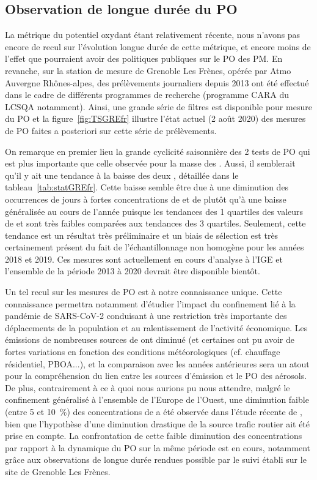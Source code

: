 \clearpage
\subsection{Observation de longue durée du PO}%
\label{sub:observation_longue_duree}

La métrique du potentiel oxydant étant relativement récente, nous n'avons pas encore de
recul sur l'évolution longue durée de cette métrique, et encore moins de l'effet que
pourraient avoir des politiques publiques sur le PO des PM. En revanche, sur la station de
mesure de Grenoble Les Frènes, opérée par Atmo Auvergne Rhônes-alpes, des prélèvements
journaliers depuis 2013 ont été effectué dans le cadre de différents programmes de
recherche (programme CARA du LCSQA notamment). Ainsi, une grande série de filtres est
disponible pour mesure du PO et la figure~\ref{fig:TSGREfr} illustre l'état actuel (2
août 2020) des mesures de PO faites a posteriori sur cette série de prélèvements.

On remarque en premier lieu la grande cyclicité saisonnière des 2 tests de PO 
qui est plus importante que celle observée pour la masse des \PMdix.
Aussi, il semblerait qu'il y ait une tendance à la baisse des deux \POv, détaillée dans le
tableau~\ref{tab:statGREfr}. Cette baisse semble être due à une diminution des occurrences
de jours à fortes concentrations de \PMdix{} et de \POv{} plutôt qu'à une baisse
généralisée au cours de l'année puisque les tendances des 1\iers{} quartiles des valeurs de
\POv{} et \PMdix{} sont très faibles comparées aux tendances des 3\iemes{} quartiles.
Seulement, cette tendance est un résultat très préliminaire et un biais de sélection est
très certainement présent du fait de l'échantillonnage non homogène pour les années 2018
et 2019.
Ces mesures sont actuellement en cours d'analyse à l'IGE et l'ensemble de la période 2013
à 2020 devrait être disponible bientôt.

Un tel recul sur les mesures de PO est à notre connaissance unique. Cette connaissance
permettra notamment d'étudier l'impact du confinement lié à la pandémie de SARS-CoV-2
conduisant à une restriction très importante des déplacements de la population et au
ralentissement de l'activité économique. Les émissions de nombreuses sources de \PMdix{}
ont diminué (et certaines ont pu avoir de fortes variations en fonction des conditions
météorologiques (cf. chauffage résidentiel, PBOA...), et la comparaison avec les années
antérieures sera un atout pour la compréhension du lien entre les sources d'émission et le
PO des aérosols. De plus, contrairement à ce à quoi nous aurions pu nous attendre, malgré
le confinement généralisé à l'ensemble de l'Europe de l'Ouest, une diminution faible
(entre 5 et \SI{10}{\percent}) des concentrations de \PMdc{} a été observée dans l'étude
récente de \cite{menutImpact2020}, bien que l'hypothèse d'une diminution drastique de la
source trafic routier ait été prise en compte.  La confrontation de cette faible diminution
des concentrations \PMdc{} par rapport à la dynamique du PO sur la même période est en
cours, notamment grâce aux observations de longue durée rendues possible par le suivi
établi sur le site de Grenoble Les Frènes.


